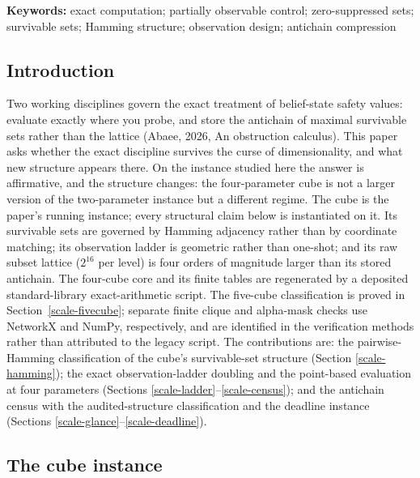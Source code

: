 \documentclass[10pt,twocolumn]{article}
\theoremstyle{plain}
\theoremstyle{definition}
\theoremstyle{remark}
\begin{document}
\textbf{Keywords:} exact computation; partially observable control;
zero-suppressed sets; survivable sets; Hamming structure; observation
design; antichain compression

\subsection{Introduction}\label{scale-introduction}

Two working disciplines govern the exact treatment of belief-state safety values: evaluate exactly where you probe, and store the antichain of maximal survivable sets rather than the lattice (Abaee, 2026, An obstruction calculus). This paper asks whether the exact discipline survives the curse of dimensionality, and what new structure appears there. On the instance studied here the answer is affirmative, and the structure changes: the four-parameter cube is not a larger version of the two-parameter instance but a different regime. The cube is the paper's running instance; every structural claim below is instantiated on it.
Its survivable sets are governed by Hamming adjacency rather than by
coordinate matching; its observation ladder is geometric rather than
one-shot; and its raw subset lattice (\(2^{16}\) per level) is four
orders of magnitude larger than its stored antichain. The four-cube core and its finite tables are regenerated by a deposited
standard-library exact-arithmetic script. The five-cube classification is
proved in Section~\ref{scale-fivecube}; separate finite clique and alpha-mask
checks use NetworkX and NumPy, respectively, and are identified in the
verification methods rather than attributed to the legacy script. The contributions are:
the pairwise-Hamming classification of the cube's survivable-set
structure (Section \ref{scale-hamming}); the exact observation-ladder
doubling and the point-based evaluation at four parameters (Sections
\ref{scale-ladder}--\ref{scale-census}); and the antichain census with the
audited-structure classification and the deadline instance (Sections
\ref{scale-glance}--\ref{scale-deadline}).

\subsection{The cube instance}\label{scale-instance}
\end{document}
